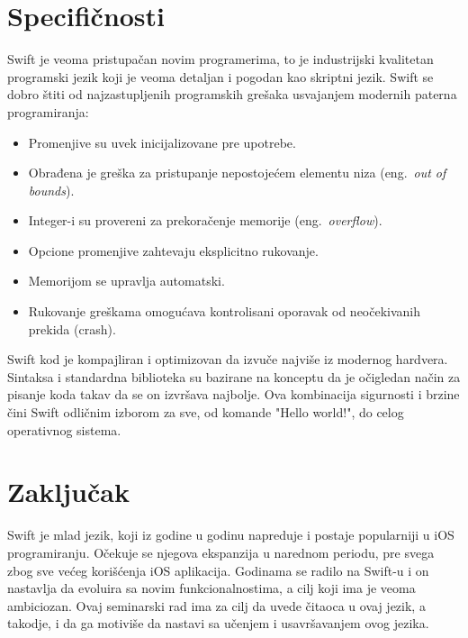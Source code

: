 \documentclass[a4paper]{article}
\begin{document}
\section{Specifičnosti}	
\label{sec:sedmiDeo}

Swift je veoma pristupačan novim programerima, to je industrijski kvalitetan programski jezik koji je veoma detaljan i pogodan kao skriptni jezik. Swift se dobro štiti od najzastupljenih programskih grešaka usvajanjem modernih paterna programiranja:
\begin{itemize}
\item Promenjive su uvek inicijalizovane pre upotrebe.
\item Obrađena je greška za pristupanje nepostojećem elementu niza (eng.~{\em out of bounds}).
\item Integer-i su provereni za prekoračenje memorije (eng.~{\em overflow}).
\item Opcione promenjive zahtevaju eksplicitno rukovanje.
\item Memorijom se upravlja automatski.
\item Rukovanje greškama omogućava kontrolisani oporavak od neočekivanih prekida (crash).
\end{itemize}

Swift kod je kompajliran i optimizovan da izvuče najviše iz modernog hardvera. Sintaksa i standardna biblioteka su bazirane na konceptu da je očigledan način za pisanje koda takav da se on izvršava najbolje. Ova kombinacija sigurnosti i brzine čini Swift odličnim izborom za sve, od komande "Hello world!", do celog operativnog sistema.

\section{Zaključak}
\label{sec:zakljucak}
Swift je mlad jezik, koji iz godine u godinu napreduje i postaje popularniji u iOS programiranju. Očekuje se njegova ekspanzija u narednom periodu, pre svega zbog sve većeg korišćenja iOS aplikacija. Godinama se radilo na Swift-u i on nastavlja da evoluira sa novim funkcionalnostima, a cilj koji ima je veoma ambiciozan. Ovaj seminarski rad ima za cilj da uvede čitaoca u ovaj jezik, a takodje, i da ga motiviše da nastavi sa učenjem i usavršavanjem ovog jezika. 

\appendix
 


\appendix
\end{document}
